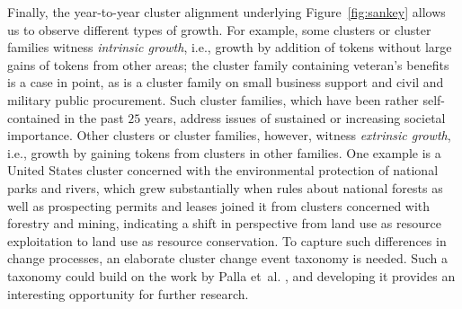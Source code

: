 Finally, the year-to-year cluster alignment underlying Figure~\ref{fig:sankey} allows us to observe different types of growth.
For example, some clusters or cluster families witness \emph{intrinsic growth}, 
i.e., growth by addition of tokens without large gains of tokens from other areas; 
the cluster family containing veteran's benefits is a case in point, 
as is a cluster family on small business support and civil and military public procurement.
Such cluster families, which have been rather self-contained in the past $25$ years, address issues of sustained or increasing societal importance.
Other clusters or cluster families, however, witness \emph{extrinsic growth}, 
i.e., growth by gaining tokens from clusters in other families.
One example is a United States cluster concerned with the environmental protection of national parks and rivers, 
which grew substantially when rules about national forests as well as prospecting permits and leases joined it from clusters concerned with forestry and mining, 
indicating a shift in perspective from land use as resource exploitation to land use as resource conservation. 
To capture such differences in change processes, 
an elaborate cluster change event taxonomy is needed. 
Such a taxonomy could build on the work by Palla et~al. \cite{palla2007},
and developing it provides an interesting opportunity for further research.
